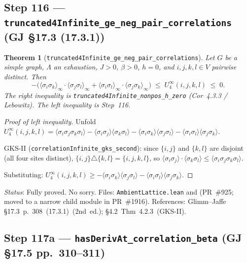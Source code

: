 \documentclass[a4paper,11pt]{article}
\newtheorem{theorem}{Theorem}
\begin{document}
\subsection*{Step 116 — \texttt{truncated4Infinite\_ge\_neg\_pair\_correlations} (GJ \S17.3 (17.3.1))}

\begin{theorem}[\texttt{truncated4Infinite\_ge\_neg\_pair\_correlations}]
Let $G$ be a simple graph, $\Lambda$ an exhaustion, $J > 0$, $\beta > 0$, $h = 0$,
and $i,j,k,l \in V$ pairwise distinct.  Then
\[
  -\bigl(\langle\sigma_i\sigma_k\rangle_\infty \cdot \langle\sigma_j\sigma_l\rangle_\infty
  + \langle\sigma_i\sigma_l\rangle_\infty \cdot \langle\sigma_j\sigma_k\rangle_\infty\bigr)
  \;\leq\; U_4^\infty(i,j,k,l) \;\leq\; 0.
\]
The right inequality is \texttt{truncated4Infinite\_nonpos\_h\_zero} (Cor~4.3.3 / Lebowitz).
The left inequality is Step~116.
\end{theorem}

\begin{proof}[Proof of left inequality]
Unfold $U_4^\infty(i,j,k,l) = \langle\sigma_i\sigma_j\sigma_k\sigma_l\rangle - \langle\sigma_i\sigma_j\rangle\langle\sigma_k\sigma_l\rangle - \langle\sigma_i\sigma_k\rangle\langle\sigma_j\sigma_l\rangle - \langle\sigma_i\sigma_l\rangle\langle\sigma_j\sigma_k\rangle$.

GKS-II (\texttt{correlationInfinite\_gks\_second}): since $\{i,j\}$ and $\{k,l\}$ are disjoint
(all four sites distinct), $\{i,j\} \triangle \{k,l\} = \{i,j,k,l\}$, so
$\langle\sigma_i\sigma_j\rangle \cdot \langle\sigma_k\sigma_l\rangle
\leq \langle\sigma_i\sigma_j\sigma_k\sigma_l\rangle$.

Substituting: $U_4^\infty(i,j,k,l) \geq -\langle\sigma_i\sigma_k\rangle\langle\sigma_j\sigma_l\rangle - \langle\sigma_i\sigma_l\rangle\langle\sigma_j\sigma_k\rangle$.
\end{proof}

\noindent\textit{Status}: Fully proved. No sorry.
Files: \texttt{AmbientLattice.lean} and
(PR~\#925; moved to a narrow child module in PR~\#1916).
References: Glimm--Jaffe \S17.3~p.~308~(17.3.1)~(2nd~ed.); \S4.2~Thm~4.2.3~(GKS-II).

\subsection*{Step 117a — \texttt{hasDerivAt\_correlation\_beta} (GJ \S17.5 pp.~310--311)}
\end{document}
